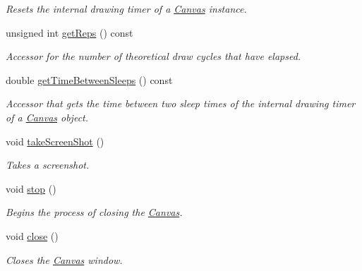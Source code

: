 \begin{DoxyCompactItemize}
\begin{DoxyCompactList}\small\item\em Resets the internal drawing timer of a \hyperlink{classtsgl_1_1_canvas}{Canvas} instance. \end{DoxyCompactList}\item 
unsigned int \hyperlink{classtsgl_1_1_canvas_a8f0819f368b41b147f1a7f560a7af6a4}{get\+Reps} () const 
\begin{DoxyCompactList}\small\item\em Accessor for the number of theoretical draw cycles that have elapsed. \end{DoxyCompactList}\item 
double \hyperlink{classtsgl_1_1_canvas_a8786d28042b767f5c075361100227af4}{get\+Time\+Between\+Sleeps} () const 
\begin{DoxyCompactList}\small\item\em Accessor that gets the time between two sleep times of the internal drawing timer of a \hyperlink{classtsgl_1_1_canvas}{Canvas} object. \end{DoxyCompactList}\item 
void \hyperlink{classtsgl_1_1_canvas_ac035f43763b198f6915a0772973a5ea9}{take\+Screen\+Shot} ()
\begin{DoxyCompactList}\small\item\em Takes a screenshot. \end{DoxyCompactList}\item 
void \hyperlink{classtsgl_1_1_canvas_a46cd37a9f2a146e57b4e0273faf6485c}{stop} ()
\begin{DoxyCompactList}\small\item\em Begins the process of closing the \hyperlink{classtsgl_1_1_canvas}{Canvas}. \end{DoxyCompactList}\item 
void \hyperlink{classtsgl_1_1_canvas_afaa1250b1da6b48b9c170a0655191938}{close} ()
\begin{DoxyCompactList}\small\item\em Closes the \hyperlink{classtsgl_1_1_canvas}{Canvas} window. \end{DoxyCompactList}\end{DoxyCompactItemize}
